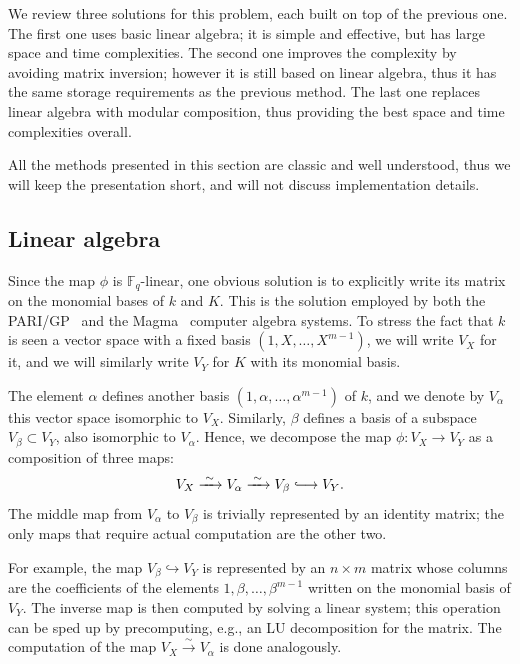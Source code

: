 \documentclass[12pt]{article}
\theoremstyle{plain}
\theoremstyle{definition}
\def\F{\ensuremath{\mathbb{F}}}
\begin{document}
We review three solutions for this problem, each built on top
of the previous one. %
The first one uses basic linear algebra; it is simple and effective,
but has large space and time complexities. %
The second one improves the complexity by avoiding matrix inversion;
however it is still based on linear algebra, thus it has the same
storage requirements as the previous method. %
The last one replaces linear algebra with modular composition, thus
providing the best space and time complexities overall. 

All the methods presented in this section are classic and well
understood, thus we will keep the presentation short, and will not
discuss implementation details.

\subsection{Linear algebra}
\label{sec:linear-algebra}

Since the map $\phi$ is $\F_q$-linear, one obvious solution is to
explicitly write its matrix on the monomial bases of $k$ and $K$. %
This is the solution employed by both the PARI/GP~\cite{Pari} and the
Magma~\cite{MAGMA,bosma+cannon+steel97} computer algebra systems. %
To stress the fact that $k$ is seen a vector space with a fixed basis
$(1,X,\dots,X^{m-1})$, we will write $V_X$ for it, and we will
similarly write $V_Y$ for $K$ with its monomial basis. %

The element $\alpha$ defines another basis
$(1,\alpha,\dots,\alpha^{m-1})$ of $k$, and we denote by $V_\alpha$
this vector space isomorphic to $V_X$. %
Similarly, $\beta$ defines a basis of a subspace $V_\beta\subset V_Y$,
also isomorphic to $V_\alpha$. %
Hence, we decompose the map $\phi:V_X\to V_Y$ as a composition of
three maps:
\[V_X \xrightarrow{\;\sim\;} V_\alpha \xrightarrow{\;\sim\;} V_\beta \lhook\joinrel\longrightarrow
  V_Y.\] %
The middle map from $V_\alpha$ to $V_\beta$ is trivially represented
by an identity matrix; the only maps that require actual computation
are the other two. %

For example, the map $V_\beta\hookrightarrow V_Y$ is represented by an
$n\times m$ matrix whose columns are the coefficients of the elements
$1,\beta,\dots,\beta^{m-1}$ written on the monomial basis of $V_Y$. %
The inverse map is then computed by solving a linear system; this
operation can be sped up by precomputing, e.g., an LU decomposition
for the matrix. %
The computation of the map $V_X\xrightarrow{\sim}V_\alpha$ is done
analogously.
\end{document}
